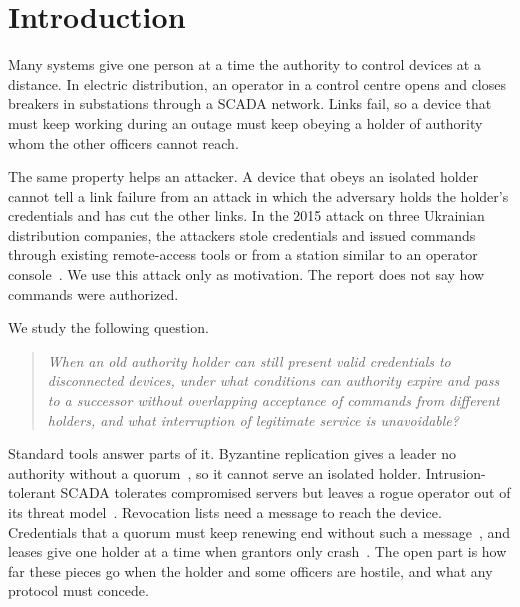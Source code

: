 \section{Introduction}
\label{sec:intro}

Many systems give one person at a time the authority to control devices at a distance. In
electric distribution, an operator in a control centre opens and closes breakers in
substations through a SCADA network. Links fail, so a device that must keep working
during an outage must keep obeying a holder of authority whom the other officers cannot
reach.

The same property helps an attacker. A device that obeys an isolated holder cannot tell a
link failure from an attack in which the adversary holds the holder's credentials and has
cut the other links. In the 2015 attack on three Ukrainian distribution companies, the
attackers stole credentials and issued commands through existing remote-access tools or
from a station similar to an operator console~\cite{eisac2016ukraine}. We use this attack
only as motivation. The report does not say how commands were authorized.

We study the following question.
\begin{quote}
\emph{When an old authority holder can still present valid credentials to disconnected
devices, under what conditions can authority expire and pass to a successor without
overlapping acceptance of commands from different holders, and what interruption of
legitimate service is unavoidable?}
\end{quote}

Standard tools answer parts of it. Byzantine replication gives a leader no authority
without a quorum~\cite{castro1999pbft}, so it cannot serve an isolated holder.
Intrusion-tolerant SCADA tolerates compromised servers but leaves a rogue operator out of
its threat model~\cite{babay2018spire}. Revocation lists need a message to reach the
device. Credentials that a quorum must keep renewing end without such a
message~\cite{luo2004ursa}, and leases give one holder at a time when grantors only
crash~\cite{vanrenesse2011nerio,gray1989leases}. The open part is how far these pieces go
when the holder and some officers are hostile, and what any protocol must concede.

